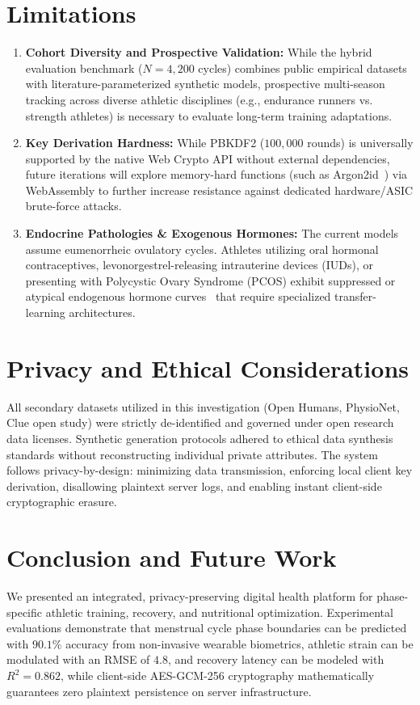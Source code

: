 \documentclass[conference]{IEEEtran}
\begin{document}
\section{Limitations}
\begin{enumerate}
    \item \textbf{Cohort Diversity and Prospective Validation:} While the hybrid evaluation benchmark ($N = 4{,}200$ cycles) combines public empirical datasets with literature-parameterized synthetic models, prospective multi-season tracking across diverse athletic disciplines (e.g., endurance runners vs. strength athletes) is necessary to evaluate long-term training adaptations.
    \item \textbf{Key Derivation Hardness:} While PBKDF2 ($100{,}000$ rounds) is universally supported by the native Web Crypto API without external dependencies, future iterations will explore memory-hard functions (such as Argon2id~\cite{biryukov2016}) via WebAssembly to further increase resistance against dedicated hardware/ASIC brute-force attacks.
    \item \textbf{Endocrine Pathologies \& Exogenous Hormones:} The current models assume eumenorrheic ovulatory cycles. Athletes utilizing oral hormonal contraceptives, levonorgestrel-releasing intrauterine devices (IUDs), or presenting with Polycystic Ovary Syndrome (PCOS) exhibit suppressed or atypical endogenous hormone curves~\cite{bozdag2023} that require specialized transfer-learning architectures.
\end{enumerate}

\section{Privacy and Ethical Considerations}
All secondary datasets utilized in this investigation (Open Humans, PhysioNet, Clue open study) were strictly de-identified and governed under open research data licenses. Synthetic generation protocols adhered to ethical data synthesis standards without reconstructing individual private attributes. The system follows privacy-by-design: minimizing data transmission, enforcing local client key derivation, disallowing plaintext server logs, and enabling instant client-side cryptographic erasure.

\section{Conclusion and Future Work}
We presented an integrated, privacy-preserving digital health platform for phase-specific athletic training, recovery, and nutritional optimization. Experimental evaluations demonstrate that menstrual cycle phase boundaries can be predicted with $90.1\%$ accuracy from non-invasive wearable biometrics, athletic strain can be modulated with an RMSE of $4.8$, and recovery latency can be modeled with $R^2 = 0.862$, while client-side AES-GCM-256 cryptography mathematically guarantees zero plaintext persistence on server infrastructure.
\end{document}
